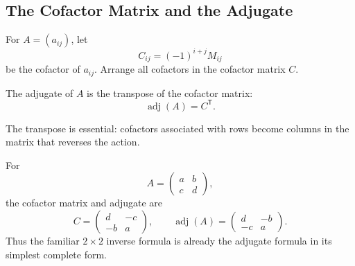 \subsection{The Cofactor Matrix and the Adjugate}

For $A=(a_{ij})$, let
\[
C_{ij}=(-1)^{i+j}M_{ij}
\]
be the cofactor of $a_{ij}$. Arrange all cofactors in the cofactor matrix $C$.

\begin{definitionbox}
The adjugate of $A$ is the transpose of the cofactor matrix:
\[
\boxed{\operatorname{adj}(A)=C^{\mathsf T}}.
\]
\end{definitionbox}

The transpose is essential: cofactors associated with rows become columns in the matrix that reverses the action.

\begin{examplebox}
For
\[
A=\begin{pmatrix}a&b\\c&d\end{pmatrix},
\]
the cofactor matrix and adjugate are
\[
C=\begin{pmatrix}d&-c\\-b&a\end{pmatrix},
\qquad
\operatorname{adj}(A)=\begin{pmatrix}d&-b\\-c&a\end{pmatrix}.
\]
Thus the familiar $2\times2$ inverse formula is already the adjugate formula in its simplest complete form.
\end{examplebox}
